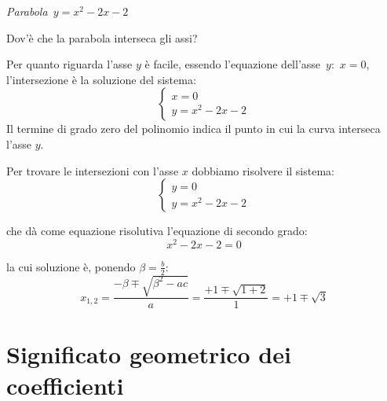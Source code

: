 \begin{minipage}{.40\textwidth}
\begin{center}
\begin{inaccessibleblock}
\begin{center} \scalebox{.9}{\graficotrinomio} \end{center}
\emph{Parabola~\(y=x^2-2x-2\)}\label{fig:parabola_trinomio2}
\end{inaccessibleblock}
\end{center}
\end{minipage}
\hfill
\begin{minipage}{.55\textwidth}
Dov'è che la parabola interseca gli assi?

Per quanto riguarda l'asse \(y\) è facile, essendo l'equazione 
dell'asse~\(y\):~\(x=0\),
l'intersezione è la soluzione del sistema:
\[\left\{\begin{array}{l}
 x=0 \\
 y=x^2-2x-2 
\end{array}\right.\]
Il termine di grado zero del polinomio indica il punto in cui la curva 
interseca l'asse \(y\). 

Per trovare le intersezioni con l'asse \(x\) dobbiamo risolvere il sistema:
\[\left\{\begin{array}{l}
 y=0 \\
 y=x^2-2x-2 
\end{array}\right.\]

che dà come equazione risolutiva l'equazione di secondo grado:
\[x^2-2x-2=0\]

la cui soluzione è, ponendo \(\beta = \frac{b}{2}\):
\[x_{1, 2} = \dfrac{-\beta \mp\sqrt{\beta^2-ac}}{a}=
             \dfrac{+1 \mp\sqrt{1+2}}{1}=+1 \mp\sqrt{3}\]

\end{minipage}


\section{Significato geometrico dei coefficienti}
\label{sec:parabola_coefficienti}

